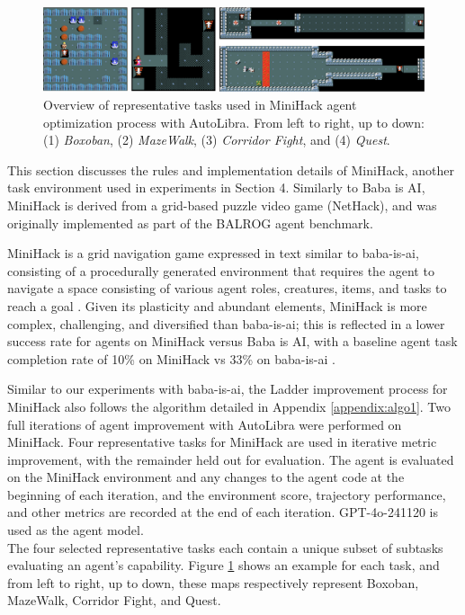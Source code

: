 \begin{figure}[ht]
	\centering
	\includegraphics[width=\textwidth]{figs/emojis/maps.png}
	\caption{Overview of representative tasks used in MiniHack agent optimization
	process with AutoLibra. From left to right, up to down: (1) \emph{Boxoban}, (2)
	\emph{MazeWalk}, (3) \emph{Corridor Fight}, and (4) \emph{Quest}.}
	\label{fig:minihack_maps}
\end{figure}

This section discusses the rules and implementation details of MiniHack, another
task environment used in experiments in Section 4. Similarly to Baba is AI, MiniHack
is derived from a grid-based puzzle video game (NetHack), and was originally
implemented as part of the BALROG \cite{paglieri2024balrog} agent benchmark.

MiniHack is a grid navigation game expressed in text similar to baba-is-ai, consisting
of a procedurally generated environment that requires the agent to navigate a space
consisting of various agent roles, creatures, items, and tasks to reach a goal
\cite{samvelyan2021minihackplanetsandboxopenended}. Given its plasticity and abundant
elements, MiniHack is more complex, challenging, and diversified than baba-is-ai;
this is reflected in a lower success rate for agents on MiniHack versus Baba is AI,
with a baseline agent task completion rate of 10\% on MiniHack vs 33\% on baba-is-ai
\cite{paglieri2024balrog}.

Similar to our experiments with baba-is-ai, the Ladder improvement process for MiniHack
also follows the algorithm detailed in Appendix \ref{appendix:algo1}. Two full
iterations of agent improvement with AutoLibra were performed on MiniHack. Four representative
tasks for MiniHack are used in iterative metric improvement, with the remainder
held out for evaluation. The agent is evaluated on the MiniHack environment and any
changes to the agent code at the beginning of each iteration, and the
environment score, trajectory performance, and other metrics are recorded at the
end of each iteration. GPT-4o-241120 is used as the agent model.\\

The four selected representative tasks each contain a unique subset of subtasks
evaluating an agent's capability. Figure \ref{fig:minihack_maps} shows an example
for each task, and from left to right, up to down, these maps respectively
represent Boxoban, MazeWalk, Corridor Fight, and Quest.

